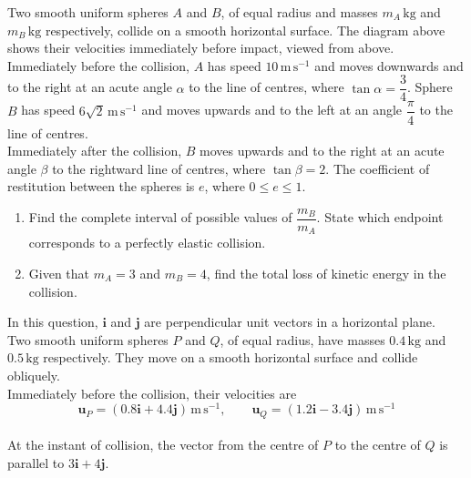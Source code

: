 \documentclass[leqno]{article}
\begin{document}
\begin{enumerate}[
  label=\textbf{\arabic*.},
  leftmargin=*,
  topsep=0pt,
  partopsep=0pt,
  parsep=0pt
]
Two smooth uniform spheres $A$ and $B$, of equal radius and masses $m_A\,\mathrm{kg}$ and $m_B\,\mathrm{kg}$ respectively, collide on a smooth horizontal surface. The diagram above shows their velocities immediately before impact, viewed from above. \\

Immediately before the collision, $A$ has speed $10\,\mathrm{m\,s^{-1}}$ and moves downwards and to the right at an acute angle $\alpha$ to the line of centres, where $\tan\alpha=\dfrac{3}{4}$. Sphere $B$ has speed $6\sqrt{2}\,\mathrm{m\,s^{-1}}$ and moves upwards and to the left at an angle $\dfrac{\pi}{4}$ to the line of centres. \\

Immediately after the collision, $B$ moves upwards and to the right at an acute angle $\beta$ to the rightward line of centres, where $\tan\beta=2$. The coefficient of restitution between the spheres is $e$, where $0\leq e\leq1$. \\
\begin{enumerate}[label=\textbf{(\alph*)}]
\item Find the complete interval of possible values of $\dfrac{m_B}{m_A}$. State which endpoint corresponds to a perfectly elastic collision.  \\
\item Given that $m_A=3$ and $m_B=4$, find the total loss of kinetic energy in the collision.  \\
\end{enumerate}

\newpage

\questionitem

In this question, $\mathbf{i}$ and $\mathbf{j}$ are perpendicular unit vectors in a horizontal plane. \\

Two smooth uniform spheres $P$ and $Q$, of equal radius, have masses $0.4\,\mathrm{kg}$ and $0.5\,\mathrm{kg}$ respectively. They move on a smooth horizontal surface and collide obliquely. \\

Immediately before the collision, their velocities are
\[
\mathbf{u}_P=(0.8\mathbf{i}+4.4\mathbf{j})\,\mathrm{m\,s^{-1}},\qquad \mathbf{u}_Q=(1.2\mathbf{i}-3.4\mathbf{j})\,\mathrm{m\,s^{-1}}
\] \\
At the instant of collision, the vector from the centre of $P$ to the centre of $Q$ is parallel to $3\mathbf{i}+4\mathbf{j}$. \\


\end{enumerate}
\end{document}
